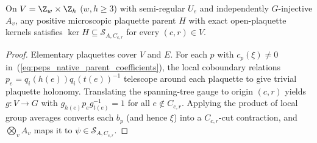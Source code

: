 \begin{lemma}%
    \label{thm:peps_native_parent_seam_boundary}
    \leanok
    On $V=\Z_w\times\Z_h$ ($w,h\ge 3$) with semi-regular $U_e$ and
    independently $G$-injective $A_v$, any positive microscopic plaquette
    parent $H$ with exact open-plaquette kernels satisfies
    $\ker H\subseteq\mathcal S_{A,C_{c,r}}$ for every $(c,r)\in V$.
\end{lemma}
\begin{proof}\leanok
    Elementary plaquettes cover $V$ and $E$. For each $p$ with $c_p(\xi)\ne 0$
    in~(\ref{eq:peps_native_parent_coefficients}), the local coboundary relations
    $p_e=q_i(h(e))q_i(t(e))^{-1}$ telescope around each plaquette to give
    trivial plaquette holonomy. Translating the spanning-tree gauge to origin
    $(c,r)$ yields $g:V\to G$ with $g_{h(e)}p_eg_{t(e)}^{-1}=1$ for all
    $e\notin C_{c,r}$. Applying the product of local group averages converts
    each $b_p$ (and hence $\xi$) into a $C_{c,r}$-cut contraction, and
    $\bigotimes_v A_v$ maps it to $\psi\in\mathcal S_{A,C_{c,r}}$.
\end{proof}

